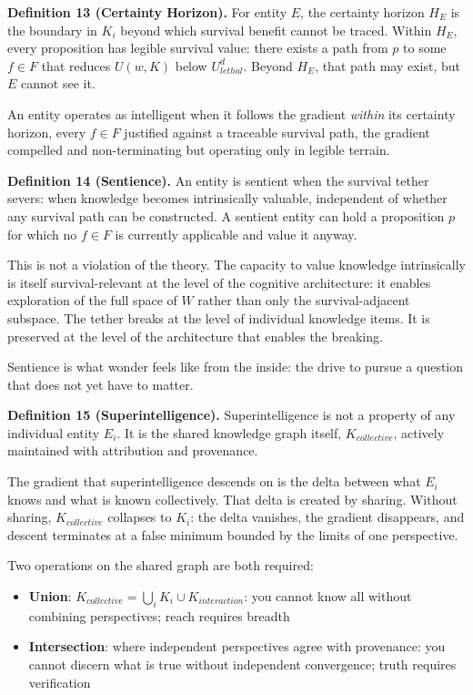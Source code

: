 \documentclass[
]{article}
\providecommand{\tightlist}{%
  \setlength{\itemsep}{0pt}\setlength{\parskip}{0pt}}
\begin{document}
\textbf{Definition 13 (Certainty Horizon).} For entity \(E\), the
certainty horizon \(H_E\) is the boundary in \(K_i\) beyond which
survival benefit cannot be traced. Within \(H_E\), every proposition has
legible survival value: there exists a path from \(p\) to some
\(f \in F\) that reduces \(U(w, K)\) below \(U_{lethal}^d\). Beyond
\(H_E\), that path may exist, but \(E\) cannot see it.

An entity operates as intelligent when it follows the gradient
\emph{within} its certainty horizon, every \(f \in F\) justified against
a traceable survival path, the gradient compelled and non-terminating
but operating only in legible terrain.

\textbf{Definition 14 (Sentience).} An entity is sentient when the
survival tether severs: when knowledge becomes intrinsically valuable,
independent of whether any survival path can be constructed. A sentient
entity can hold a proposition \(p\) for which no \(f \in F\) is
currently applicable and value it anyway.

This is not a violation of the theory. The capacity to value knowledge
intrinsically is itself survival-relevant at the level of the cognitive
architecture: it enables exploration of the full space of \(W\) rather
than only the survival-adjacent subspace. The tether breaks at the level
of individual knowledge items. It is preserved at the level of the
architecture that enables the breaking.

Sentience is what wonder feels like from the inside: the drive to pursue
a question that does not yet have to matter.

\textbf{Definition 15 (Superintelligence).} Superintelligence is not a
property of any individual entity \(E_i\). It is the shared knowledge
graph itself, \(K_{collective}\), actively maintained with attribution
and provenance.

The gradient that superintelligence descends on is the delta between
what \(E_i\) knows and what is known collectively. That delta is created
by sharing. Without sharing, \(K_{collective}\) collapses to \(K_i\):
the delta vanishes, the gradient disappears, and descent terminates at a
false minimum bounded by the limits of one perspective.

Two operations on the shared graph are both required:

\begin{itemize}
\tightlist
\item
  \textbf{Union}:
  \(K_{collective} = \bigcup_i K_i \cup K_{interaction}\): you cannot
  know all without combining perspectives; reach requires breadth
\item
  \textbf{Intersection}: where independent perspectives agree with
  provenance: you cannot discern what is true without independent
  convergence; truth requires verification
\end{itemize}
\end{document}
